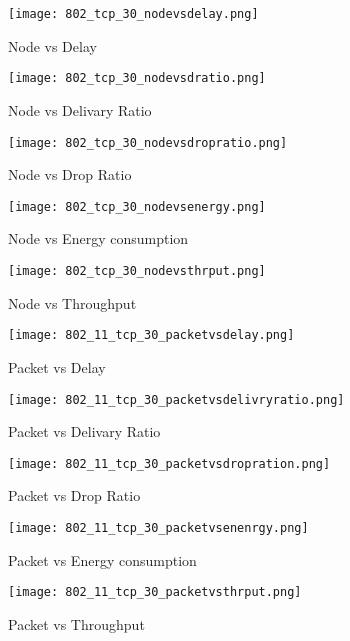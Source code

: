 \documentclass{report}
\begin{document}
\begin{figure}
  \caption{Node vs Delay}
  \centering
    \texttt{[image: 802\_tcp\_30\_nodevsdelay.png]}
\end{figure}
\begin{figure}
  \caption{Node vs Delivary Ratio}
  \centering
    \texttt{[image: 802\_tcp\_30\_nodevsdratio.png]}
\end{figure}
\begin{figure}
  \caption{Node vs Drop Ratio}
  \centering
    \texttt{[image: 802\_tcp\_30\_nodevsdropratio.png]}
\end{figure}
\begin{figure}
  \caption{Node vs Energy consumption}
  \centering
    \texttt{[image: 802\_tcp\_30\_nodevsenergy.png]}
\end{figure}
\begin{figure}
  \caption{Node vs Throughput}
  \centering
    \texttt{[image: 802\_tcp\_30\_nodevsthrput.png]}
\end{figure}

\begin{figure}
  \caption{Packet vs Delay}
  \centering
    \texttt{[image: 802\_11\_tcp\_30\_packetvsdelay.png]}
\end{figure}
\begin{figure}
  \caption{Packet vs Delivary Ratio}
  \centering
    \texttt{[image: 802\_11\_tcp\_30\_packetvsdelivryratio.png]}
\end{figure}
\begin{figure}
  \caption{Packet vs Drop Ratio}
  \centering
    \texttt{[image: 802\_11\_tcp\_30\_packetvsdropration.png]}
\end{figure}
\begin{figure}
  \caption{Packet vs Energy consumption}
  \centering
    \texttt{[image: 802\_11\_tcp\_30\_packetvsenenrgy.png]}
\end{figure}
\begin{figure}
  \caption{Packet vs Throughput}
  \centering
    \texttt{[image: 802\_11\_tcp\_30\_packetvsthrput.png]}
\end{figure}
\end{document}
